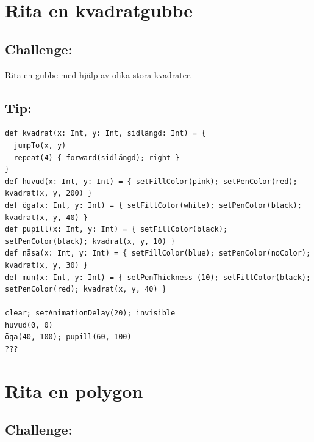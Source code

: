 \chapter{Rita en kvadratgubbe}\section*{\color{BrickRed}Challenge:}
Rita en gubbe med hjälp av olika stora kvadrater.
\\


  
\section*{\color{OliveGreen}Tip:}

\begin{lstlisting}[basicstyle={\ttfamily\fontsize{14}{17}\selectfont},numbers=none]
def kvadrat(x: Int, y: Int, sidlängd: Int) = {
  jumpTo(x, y)
  repeat(4) { forward(sidlängd); right }
}
def huvud(x: Int, y: Int) = { setFillColor(pink); setPenColor(red); kvadrat(x, y, 200) }
def öga(x: Int, y: Int) = { setFillColor(white); setPenColor(black); kvadrat(x, y, 40) }
def pupill(x: Int, y: Int) = { setFillColor(black); setPenColor(black); kvadrat(x, y, 10) }
def näsa(x: Int, y: Int) = { setFillColor(blue); setPenColor(noColor); kvadrat(x, y, 30) }
def mun(x: Int, y: Int) = { setPenThickness (10); setFillColor(black); setPenColor(red); kvadrat(x, y, 40) }

clear; setAnimationDelay(20); invisible
huvud(0, 0)
öga(40, 100); pupill(60, 100)
???
\end{lstlisting}
        
\chapter{Rita en polygon}\section*{\color{BrickRed}Challenge:}


